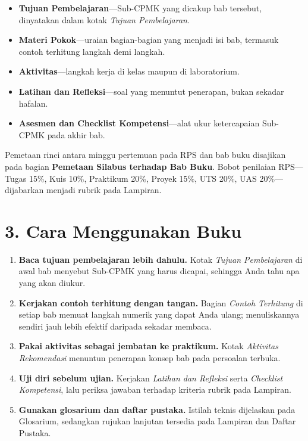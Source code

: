 \documentclass[../main.tex]{subfiles}
\begin{document}
\begin{itemize}
    \item \textbf{Tujuan Pembelajaran}---Sub-CPMK yang dicakup bab tersebut,
          dinyatakan dalam kotak \textit{Tujuan Pembelajaran}.
    \item \textbf{Materi Pokok}---uraian bagian-bagian yang menjadi isi bab,
          termasuk contoh terhitung langkah demi langkah.
    \item \textbf{Aktivitas}---langkah kerja di kelas maupun di laboratorium.
    \item \textbf{Latihan dan Refleksi}---soal yang menuntut penerapan, bukan
          sekadar hafalan.
    \item \textbf{Asesmen dan Checklist Kompetensi}---alat ukur ketercapaian
          Sub-CPMK pada akhir bab.
\end{itemize}

Pemetaan rinci antara minggu pertemuan pada RPS dan bab buku disajikan pada
bagian \textbf{Pemetaan Silabus terhadap Bab Buku}. Bobot penilaian RPS---Tugas
15\%, Kuis 10\%, Praktikum 20\%, Proyek 15\%, UTS 20\%, UAS 20\%---dijabarkan
menjadi rubrik pada Lampiran.

\section*{3. Cara Menggunakan Buku}

\begin{enumerate}[label=\arabic*.]
    \item \textbf{Baca tujuan pembelajaran lebih dahulu.} Kotak
          \textit{Tujuan Pembelajaran} di awal bab menyebut Sub-CPMK yang harus
          dicapai, sehingga Anda tahu apa yang akan diukur.
    \item \textbf{Kerjakan contoh terhitung dengan tangan.} Bagian
          \textit{Contoh Terhitung} di setiap bab memuat langkah numerik yang
          dapat Anda ulang; menuliskannya sendiri jauh lebih efektif daripada
          sekadar membaca.
    \item \textbf{Pakai aktivitas sebagai jembatan ke praktikum.} Kotak
          \textit{Aktivitas Rekomendasi} menuntun penerapan konsep bab pada
          persoalan terbuka.
    \item \textbf{Uji diri sebelum ujian.} Kerjakan \textit{Latihan dan
          Refleksi} serta \textit{Checklist Kompetensi}, lalu periksa jawaban
          terhadap kriteria rubrik pada Lampiran.
    \item \textbf{Gunakan glosarium dan daftar pustaka.} Istilah teknis
          dijelaskan pada Glosarium, sedangkan rujukan lanjutan tersedia pada
          Lampiran dan Daftar Pustaka.
\end{enumerate}
\end{document}
